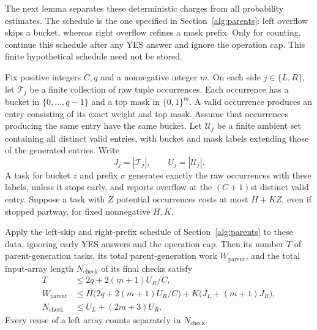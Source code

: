 The next lemma separates these deterministic charges from all
probability estimates. The schedule is the one specified in
Section~\ref{alg:parents}: left overflow skips a bucket, whereas right
overflow refines a mask prefix. Only for counting, continue this
schedule after any YES answer and ignore the operation cap. This
finite hypothetical schedule need not be stored.

\begin{lemma}\label{lem:prefix}
Fix positive integers $C,q$ and a nonnegative integer $m$. On each
side $j\in\{L,R\}$, let $\mathcal T_j$ be a finite collection of
raw tuple occurrences. Each occurrence has a bucket in
$\{0,\ldots,q-1\}$ and a top mask in $\{0,1\}^m$. A valid occurrence
produces an entry consisting of its exact weight and top mask.
Assume that occurrences producing the same entry have the same
bucket. Let $\mathcal U_j$ be a finite ambient set containing all
distinct valid entries, with bucket and mask labels extending those
of the generated entries. Write
\[
 J_j=|\mathcal T_j|,\qquad U_j=|\mathcal U_j|.
\]
A task for bucket $z$ and prefix $\sigma$ generates exactly the raw
occurrences with these labels, unless it stops early, and reports
overflow at the $(C+1)$st distinct valid entry. Suppose a task with
$Z$ potential occurrences costs at most $H+KZ$, even if stopped
partway, for fixed nonnegative $H,K$.

Apply the left-skip and right-prefix schedule of
Section~\ref{alg:parents} to these data, ignoring early YES answers and
the operation cap. Then its number $T$ of parent-generation tasks,
its total parent-generation work $W_{\mathrm{parent}}$, and the total
input-array length $N_{\mathrm{check}}$ of its final checks satisfy
\begin{align}
 T&\le 2q+2(m+1)U_R/C,\label{eq:prefix-tasks}\\
 W_{\mathrm{parent}}
 &\le H\bigl(2q+2(m+1)U_R/C\bigr)
       +K\bigl(J_L+(m+1)J_R\bigr),\label{eq:prefix-work}\\
 N_{\mathrm{check}}&\le U_L+(2m+3)U_R.\label{eq:prefix-checks}
\end{align}
Every reuse of a left array counts separately in
$N_{\mathrm{check}}$.
\end{lemma}

